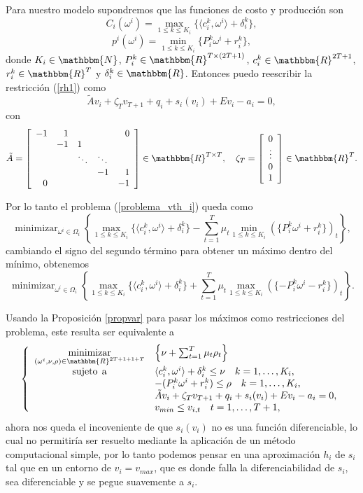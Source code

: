 \documentclass[a4paper,12pt]{report}
\newcommand{\la}{\langle}
\newcommand{\ra}{\rangle}
\newcommand{\RR}{\mathbbm{R}}
\newcommand{\om}{\omega}
\begin{document}
Para nuestro modelo supondremos que las funciones de costo y producci\'on son  
$$C_i(\om^i)=\max_{1\leq k\leq K_i}\{\la c_i^k,\om^i\ra+\delta_i^k\},$$
$$p^i(\om^i)=\min_{1\leq k\leq K_i}\{P_i^k\om^i+r_i^k\},$$
donde $K_i\in\mathbbm{N}$, $P_i^k\in\RR^{T\times (2T+1)}$, $c_i^k\in\RR^{2T+1}$, $r_i^k\in\RR^{T}$ y $\delta_i^k\in\RR$.
Entonces puedo reescribir la restricci\'on (\ref{rh1}) como
\begin{equation}\label{rh3}
\tilde{A}v_i+\zeta_T v_{T+1}+q_i+s_i(v_i)+Ev_i-a_i=0,
\end{equation}
con
$$\tilde{A}=\left[
\begin{array}{rrllr}
-1 & 1 &  &  & 0\\
  &-1 & 1 &  &  \\
   &   & \ddots &  \ddots  &\\
&&&-1&1\\
0&&&&-1
\end{array}
\right]\in\RR^{T\times T},\quad
\zeta_T=\left[\begin{array}{c} 0\\ \vdots\\0\\1\end{array}\right]\in\RR^T.$$

Por lo tanto el problema (\ref{problema_vth_i}) queda como 
$$\mathop{\mathrm{minimizar}}_{\om^i\in\Omega_i}\left\{\max_{1\leq k\leq  K_i}\{\la c_i^k,\om^i\ra+\delta_i^k\}-\sum_{t=1}^T\mu_t\min_{1\leq k\leq  K_i}(\{P_i^k\om^i+r_i^k\})_t\right\},$$
cambiando el signo del segundo t\'ermino para obtener un m\'aximo dentro del m\'inimo, obtenemos
$$\mathop{\mathrm{minimizar}}_{\om^i\in\Omega_i}\left\{\max_{1\leq k\leq  K_i}\{\la c_i^k,\om^i\ra+\delta_i^k\}+\sum_{t=1}^T\mu_t\max_{1\leq k\leq  K_i}(\{-P_i^k\om^i-r_i^k\})_t\right\}.$$

Usando la Proposici\'on \ref{propvar} para pasar los m\'aximos como restricciones del problema, este resulta ser equivalente a 
\begin{equation}\label{problemahidro1}
\left\{
\begin{array}{cl}
\displaystyle\mathop{\mathrm{minimizar}}_{({\om}^i,\nu,\rho)\in\RR^{2T+1+1+T}}&\left\{\nu+\sum_{t=1}^T\mu_t\rho_t\right\}\\
  \mathrm{sujeto\,\;a}& \la c_i^k,\om^i\ra+\delta_i^k\leq\nu\quad k=1,\ldots,K_i,\\
  	&	-(P_i^k\om^i+r_i^k)\leq\rho\quad k=1,\ldots,K_i,\\
  	&	\tilde{A}v_i+\zeta_T v_{T+1}+q_i+s_i(v_i)+Ev_i-a_i=0,\\
  	&	v_{min}\leq v_{i,t}\quad t=1,\ldots,T+1, 	
 \end{array}
\right.
\end{equation}
ahora nos queda el incoveniente de que $s_i(v_i)$ no es una funci\'on diferenciable, lo cual no permitir\'ia ser resuelto mediante la aplicaci\'on de un m\'etodo computacional simple, por lo tanto podemos pensar en una aproximaci\'on $h_i$ de $s_i$ tal que en un entorno de $v_i=v_{max}$, que es donde falla la diferenciabilidad de $s_i$, sea diferenciable y se pegue suavemente a $s_i$.
\end{document}
